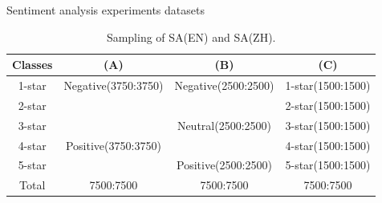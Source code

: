\begin{table}[h]
\footnotesize
\centering
\caption{Sentiment analysis experiments datasets}
\label{tab:sa_dataexp}
\begin{subtable}{\textwidth}
\centering
\caption{Sampling of SA(EN) and SA(ZH).}
\begin{tabular}{|c|c|c|c|}
	\hline
	Classes & (A)                                  & (B)                 & (C)               \\ \hline
	1-star  & \multirow{2}{*}{Negative(3750:3750)} & Negative(2500:2500) & 1-star(1500:1500) \\ \cline{1-1} \cline{3-4} 
	2-star  &                                      &                     & 2-star(1500:1500) \\ \hline
	3-star  &                                      & Neutral(2500:2500)  & 3-star(1500:1500) \\ \hline
	4-star  & \multirow{2}{*}{Positive(3750:3750)} &                     & 4-star(1500:1500) \\ \cline{1-1} \cline{3-4} 
	5-star  &                                      & Positive(2500:2500) & 5-star(1500:1500) \\ \hline
	Total   & 7500:7500                            & 7500:7500           & 7500:7500         \\ \hline
\end{tabular}
\end{subtable}
\end{table}